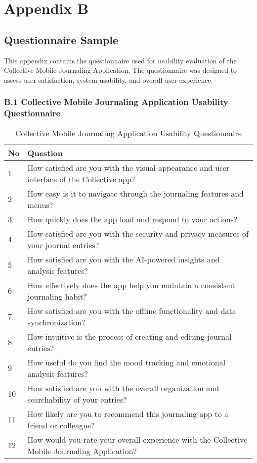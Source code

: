 \chapter*{Appendix B}

\section*{Questionnaire Sample}

This appendix contains the questionnaire used for usability evaluation of the Collective Mobile Journaling Application. The questionnaire was designed to assess user satisfaction, system usability, and overall user experience.

\subsection*{B.1 Collective Mobile Journaling Application Usability Questionnaire}

\begin{table}[H]
\centering
\caption{Collective Mobile Journaling Application Usability Questionnaire}
\label{tab:usability-questionnaire}
\begin{tabular}{|p{1.5cm}|p{12cm}|}
\hline
\textbf{No} & \textbf{Question} \\
\hline
1 & How satisfied are you with the visual appearance and user interface of the Collective app? \\
\hline
2 & How easy is it to navigate through the journaling features and menus? \\
\hline
3 & How quickly does the app load and respond to your actions? \\
\hline
4 & How satisfied are you with the security and privacy measures of your journal entries? \\
\hline
5 & How satisfied are you with the AI-powered insights and analysis features? \\
\hline
6 & How effectively does the app help you maintain a consistent journaling habit? \\
\hline
7 & How satisfied are you with the offline functionality and data synchronization? \\
\hline
8 & How intuitive is the process of creating and editing journal entries? \\
\hline
9 & How useful do you find the mood tracking and emotional analysis features? \\
\hline
10 & How satisfied are you with the overall organization and searchability of your entries? \\
\hline
11 & How likely are you to recommend this journaling app to a friend or colleague? \\
\hline
12 & How would you rate your overall experience with the Collective Mobile Journaling Application? \\
\hline
\end{tabular}
\end{table}

